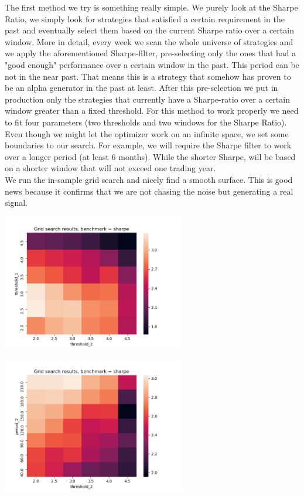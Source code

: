 The first method we try is something really simple. We purely look at the Sharpe Ratio, we simply look for strategies that satisfied a certain requirement in the past and eventually select them based on the current Sharpe ratio over a certain window. More in detail, every week we scan the whole universe of strategies and we apply the aforementioned Sharpe-filter, pre-selecting only the ones that had a "good enough" performance over a certain window in the past. This period can be not in the near past. That means this is a strategy that somehow has proven to be an alpha generator in the past at least. After this pre-selection we put in production only the strategies that currently have a Sharpe-ratio over a certain window greater than a fixed threshold. For this method to work properly we need to fit four parameters (two thresholds and two windows for the Sharpe Ratio). Even though we might let the optimizer work on an infinite space, we set some boundaries to our search. For example, we will require the Sharpe filter to work over a longer period (at least 6 months). While the shorter Sharpe, will be based on a shorter window that will not exceed one trading year.\\
We run the in-sample grid search and nicely find a smooth surface. This is good news because it confirms that we are not chasing the noise but generating a real signal. 

\begin{center}
	\centering
	\includegraphics[width=0.6\textwidth]{GridSearches/Sharpe_Basic/Figure_1.png}
	\label{Sharpe_Simple_1}
\end{center}

\begin{center}
	\centering
	\includegraphics[width=0.6\textwidth]{GridSearches/Sharpe_Basic/Figure_2.png}
	\label{Sharpe_Ranking_2}
\end{center}

